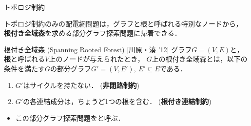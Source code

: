 \documentclass[dvipdfmx,11pt]{beamer}
\begin{document}
\begin{frame}{トポロジ制約}
  \begin{alertblock}{}
    トポロジ制約のみの配電網問題は，グラフと根と呼ばれる特別なノードから，
    \alert{\bf 根付き全域森}を求める部分グラフ探索問題に帰着できる．
  \end{alertblock}
  \vfill
  \begin{block}{根付き全域森 (Spanning Rooted Forest) [川原・湊 '12]}
    グラフ$G=(V,E)$と，
    \textbf{根}と呼ばれる$V$上のノードが与えられたとき，
    $G$上の根付き全域森とは，以下の条件を満たす$G$の部分グラフ$G'=(V,E'),\ E' \subseteq E$である．
    \begin{enumerate}
    \item $G'$はサイクルを持たない． (\alert{\bf 非閉路制約})
    \item $G'$の各連結成分は，ちょうど1つの根を含む． (\alert{\bf 根付き連結制約})
    \end{enumerate}
  \end{block}\vfill
 \begin{itemize}
  \item この部分グラフ探索問題をと呼ぶ．
 \end{itemize}
\end{frame}
\end{document}
